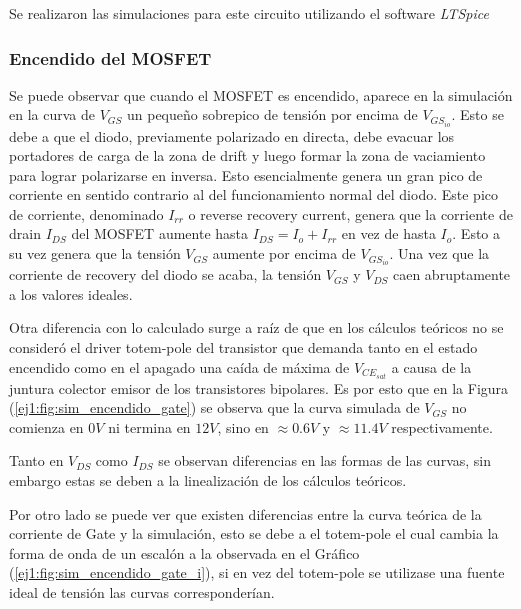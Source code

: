 Se realizaron las simulaciones para este circuito utilizando el software \textit{LTSpice}

\subsubsection{Encendido del MOSFET}

Se puede observar que cuando el MOSFET es encendido, aparece en la simulación en la curva de $V_{GS}$ un pequeño sobrepico de tensión por encima de $V_{GS_{io}}$. Esto se debe a que el diodo, previamente polarizado en directa, debe evacuar los portadores de carga de la zona de drift y luego formar la zona de vaciamiento para lograr polarizarse en inversa. Esto esencialmente genera un gran pico de corriente en sentido contrario al del funcionamiento normal del diodo. Este pico de corriente, denominado $I_{rr}$ o reverse recovery current, genera que la corriente de drain $I_{DS}$ del MOSFET aumente hasta $I_{DS} = I_o+I_{rr}$ en vez de hasta $I_o$. Esto a su vez genera que la tensión $V_{GS}$ aumente por encima de $V_{GS_{io}}$. Una vez que la corriente de recovery del diodo se acaba, la tensión $V_{GS}$ y $V_{DS}$ caen abruptamente a los valores ideales.

Otra diferencia con lo calculado surge a raíz de que en los cálculos teóricos no se consideró el driver totem-pole del transistor que demanda tanto en el estado encendido como en el apagado una caída de máxima de $V_{CE_{sat}}$ a causa de la juntura colector emisor de los transistores bipolares. Es por esto que en la Figura (\ref{ej1:fig:sim_encendido_gate}) se observa que la curva simulada de $V_{GS}$ no comienza en $0V$ ni termina en $12V$, sino en $\approx 0.6V$ y $\approx 11.4V$ respectivamente.

Tanto en $V_{DS}$ como $I_{DS}$ se observan diferencias en las formas de las curvas, sin embargo estas se deben a la linealización de los cálculos teóricos.

Por otro lado se puede ver que existen diferencias entre la curva teórica de la corriente de Gate y la simulación, esto se debe a el totem-pole  el cual cambia la forma de onda de un escalón a la observada en el Gráfico (\ref{ej1:fig:sim_encendido_gate_i}), si en vez del totem-pole se utilizase una fuente ideal de tensión las curvas corresponderían.

